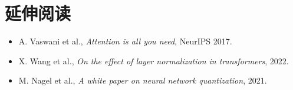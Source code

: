 \section*{延伸阅读}
\begin{itemize}[leftmargin=2em,itemsep=2pt]
  \item A. Vaswani et al., \emph{Attention is all you need}, NeurIPS 2017.
  \item X. Wang et al., \emph{On the effect of layer normalization in transformers}, 2022.
  \item M. Nagel et al., \emph{A white paper on neural network quantization}, 2021.
\end{itemize}

